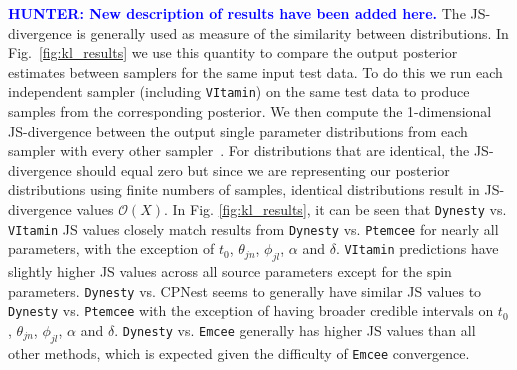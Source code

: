 \documentclass[%
showpacs,
nofootinbib,
 amsmath,amssymb,
 aps,
 twocolumn,
 prl,
 reprint,
floatfix,
]{revtex4-1}
\newcommand{\hunter}[1]{\textbf{\textcolor{blue}{HUNTER: #1}}}
\begin{document}
%
%
\hunter{New description of results have been added here.}
The \ac{JS}-divergence is generally used as measure of the similarity 
between distributions.  In Fig.~\ref{fig:kl_results} 
we use this quantity to compare the output posterior estimates between 
samplers for the same input test data. To do this we run each independent 
sampler (including \texttt{VItamin}) on the same test data to produce 
samples from the corresponding posterior. We then compute the 
1-dimensional \ac{JS}-divergence between the output single 
parameter distributions from each sampler with every 
other sampler~\cite{4839047}. For distributions that are 
identical, the \ac{JS}-divergence {should} equal zero but since we 
are representing our posterior distributions using finite numbers of 
samples, identical distributions result in \ac{JS}-divergence values
$\mathcal{O}(X)$.  
In Fig. \ref{fig:kl_results}, it can be seen that \texttt{Dynesty}  
vs. \texttt{VItamin} JS values closely match results from 
\texttt{Dynesty} vs. \texttt{Ptemcee} for nearly all parameters, with 
the exception of $t_0$, $\theta_{jn}$, $\phi_{jl}$, $\alpha$ and 
$\delta$. \texttt{VItamin} predictions have slightly 
higher \ac{JS} values across all source parameters except for the 
spin parameters. \texttt{Dynesty} vs. CPNest seems to generally 
have similar JS values to \texttt{Dynesty} vs. \texttt{Ptemcee} with 
the exception of having broader credible intervals on $t_0$, 
$\theta_{jn}$, $\phi_{jl}$, $\alpha$ and $\delta$. 
\texttt{Dynesty} vs. \texttt{Emcee} generally has higher JS values than 
all other methods, which is expected given the difficulty of 
\texttt{Emcee} convergence.
  


\end{document}
